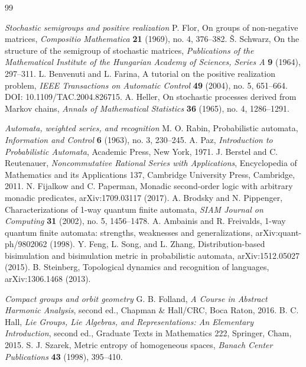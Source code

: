\begin{thebibliography}{99}
\item[]\textit{Stochastic semigroups and positive realization}
 P. Flor, On groups of non-negative matrices, \emph{Compositio Mathematica} \textbf{21} (1969), no. 4, 376--382.
 \v S. Schwarz, On the structure of the semigroup of stochastic matrices, \emph{Publications of the Mathematical Institute of the Hungarian Academy of Sciences, Series A} \textbf{9} (1964), 297--311.
 L. Benvenuti and L. Farina, A tutorial on the positive realization problem, \emph{IEEE Transactions on Automatic Control} \textbf{49} (2004), no. 5, 651--664. DOI: 10.1109/TAC.2004.826715.
 A. Heller, On stochastic processes derived from Markov chains, \emph{Annals of Mathematical Statistics} \textbf{36} (1965), no. 4, 1286--1291.
\item[]\textit{Automata, weighted series, and recognition}
 M. O. Rabin, Probabilistic automata, \emph{Information and Control} \textbf{6} (1963), no. 3, 230--245.
 A. Paz, \emph{Introduction to Probabilistic Automata}, Academic Press, New York, 1971.
 J. Berstel and C. Reutenauer, \emph{Noncommutative Rational Series with Applications}, Encyclopedia of Mathematics and its Applications 137, Cambridge University Press, Cambridge, 2011.
 N. Fijalkow and C. Paperman, Monadic second-order logic with arbitrary monadic predicates, arXiv:1709.03117 (2017).
 A. Brodsky and N. Pippenger, Characterizations of 1-way quantum finite automata, \emph{SIAM Journal on Computing} \textbf{31} (2002), no. 5, 1456--1478.
 A. Ambainis and R. Freivalds, 1-way quantum finite automata: strengths, weaknesses and generalizations, arXiv:quant-ph/9802062 (1998).
 Y. Feng, L. Song, and L. Zhang, Distribution-based bisimulation and bisimulation metric in probabilistic automata, arXiv:1512.05027 (2015).
 B. Steinberg, Topological dynamics and recognition of languages, arXiv:1306.1468 (2013).
\item[]\textit{Compact groups and orbit geometry}
 G. B. Folland, \emph{A Course in Abstract Harmonic Analysis}, second ed., Chapman \& Hall/CRC, Boca Raton, 2016.
 B. C. Hall, \emph{Lie Groups, Lie Algebras, and Representations: An Elementary Introduction}, second ed., Graduate Texts in Mathematics 222, Springer, Cham, 2015.
 S. J. Szarek, Metric entropy of homogeneous spaces, \emph{Banach Center Publications} \textbf{43} (1998), 395--410.

\end{thebibliography}
